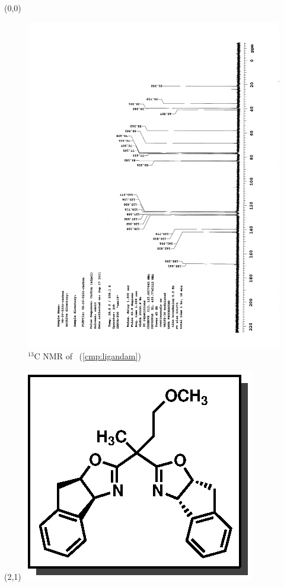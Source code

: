 \clearpage
\begin{textblock}{20}(0,0)
\begin{figure}[htb]
\caption{$^{13}$C NMR of  \CMPligandam\ (\ref{cmp:ligandam})}
\includegraphics[scale=0.75, trim = 0mm 0mm 0mm 5mm,
clip]{chp_asymmetric/images/nmr/ligandamC}
\vspace{-100pt}
\end{figure}
\end{textblock}
\begin{textblock}{1}(2,1)
\includegraphics[scale=0.8, angle=90]{chp_asymmetric/images/ligandam}
\end{textblock}
\clearpage
